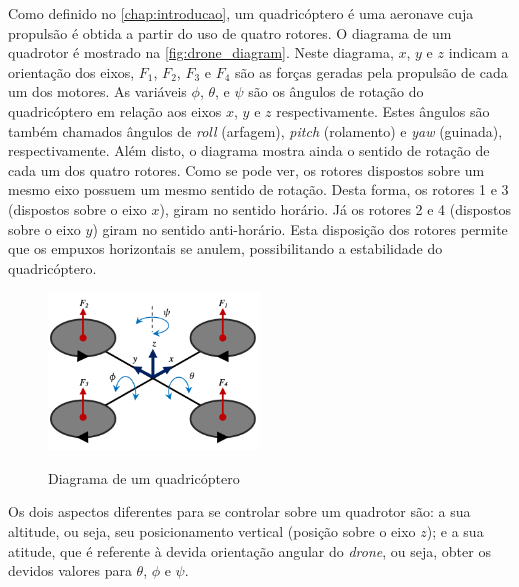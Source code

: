 Como definido no \autoref{chap:introducao}, um quadricóptero é uma aeronave cuja propulsão é obtida a partir do uso de quatro rotores. O diagrama de um quadrotor é mostrado na \autoref{fig:drone_diagram}. Neste diagrama, $x$, $y$ e $z$ indicam a orientação dos eixos, $F_1$, $F_2$, $F_3$ e $F_4$ são as forças geradas pela propulsão de cada um dos motores. As variáveis $\phi$, $\theta$, e $\psi$ são os ângulos de rotação do quadricóptero em relação aos eixos $x$, $y$ e $z$ respectivamente. Estes ângulos são também chamados ângulos de \textit{roll} (arfagem), \textit{pitch} (rolamento) e \textit{yaw} (guinada), respectivamente. Além disto, o diagrama mostra ainda o sentido de rotação de cada um dos quatro rotores. Como se pode ver, os rotores dispostos sobre um mesmo eixo possuem um mesmo sentido de rotação. Desta forma, os rotores 1 e 3 (dispostos sobre o eixo $x$), giram no sentido horário. Já os rotores 2 e 4 (dispostos sobre o eixo $y$) giram no sentido anti-horário. Esta disposição dos rotores permite que os empuxos horizontais se anulem, possibilitando a estabilidade do quadricóptero.

\begin{figure}[!htb]
    \centering
    \caption{Diagrama de um quadricóptero}
    \includegraphics[width=0.5\textwidth]{./04-figuras/drone_diagram/drone_diagram_20}
    \label{fig:drone_diagram}
\end{figure}

Os dois aspectos diferentes para se controlar sobre um quadrotor são: a sua altitude, ou seja, seu posicionamento vertical (posição sobre o eixo $z$); e a sua atitude, que é referente à devida orientação angular do \textit{drone}, ou seja, obter os devidos valores para $\theta$, $\phi$ e $\psi$. 



